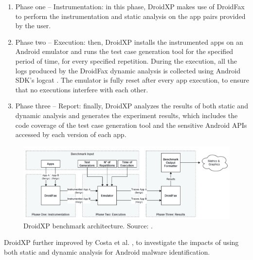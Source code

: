 \begin{enumerate}
    \item Phase one -- Instrumentation: in this phase, DroidXP makes use of DroidFax to perform the instrumentation and static analysis on the app pairs provided by the user.
    \item Phase two -- Execution: then, DroidXP installs the instrumented apps on an Android emulator and runs the test case generation tool for the specified period of time, for every specified repetition. During the execution, all the logs produced by the DroidFax dynamic analysis is collected using Android SDK's logcat \cite{noauthor_logcat_2023}. The emulator is fully reset after every app execution, to ensure that no executions interfere with each other.
    \item Phase three -- Report: finally, DroidXP analyzes the results of both static and dynamic analysis and generates the experiment results, which includes the code coverage of the test case generation tool and the sensitive Android APIs accessed by each version of each app.
\end{enumerate}

\begin{figure}
    \centering
    \includegraphics[width=\textwidth]{img/droidxp.png}
    \caption{DroidXP benchmark architecture. Source: \cite{costa_droidxp_2020}.}
    \label{fig:droidxp-arch}
\end{figure}

DroidXP further improved by Costa et al. \cite{costa_exploring_2022}, to investigate the impacts of using both static and dynamic analysis for Android malware identification.
